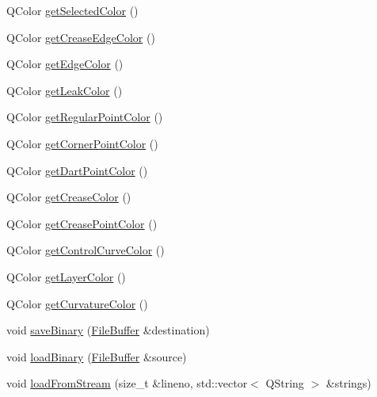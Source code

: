 \begin{DoxyCompactItemize}
Q\-Color \hyperlink{classShipCAD_1_1SubdivisionSurface_a4d307277e2a96d86b3d3e7788c2aac0a}{get\-Selected\-Color} ()
\item 
Q\-Color \hyperlink{classShipCAD_1_1SubdivisionSurface_a50b5868db7d2c5d6cce75fa2b52be60f}{get\-Crease\-Edge\-Color} ()
\item 
Q\-Color \hyperlink{classShipCAD_1_1SubdivisionSurface_a40dd77bdff5cf86b4a6eca7ff5a2e643}{get\-Edge\-Color} ()
\item 
Q\-Color \hyperlink{classShipCAD_1_1SubdivisionSurface_ac3131c3badeb6b11cb8a5ec5ceef0961}{get\-Leak\-Color} ()
\item 
Q\-Color \hyperlink{classShipCAD_1_1SubdivisionSurface_afdf406376421eb43a34f53392fbcf5b1}{get\-Regular\-Point\-Color} ()
\item 
Q\-Color \hyperlink{classShipCAD_1_1SubdivisionSurface_af64e951c070d6c88f70c399bc13809d1}{get\-Corner\-Point\-Color} ()
\item 
Q\-Color \hyperlink{classShipCAD_1_1SubdivisionSurface_ac355dfe572889755c24d1c8cd3145aea}{get\-Dart\-Point\-Color} ()
\item 
Q\-Color \hyperlink{classShipCAD_1_1SubdivisionSurface_a6aad1f3725f8033bb85403a01c252006}{get\-Crease\-Color} ()
\item 
Q\-Color \hyperlink{classShipCAD_1_1SubdivisionSurface_a82c8cb1c6c448be7554bcb42e0099660}{get\-Crease\-Point\-Color} ()
\item 
Q\-Color \hyperlink{classShipCAD_1_1SubdivisionSurface_a5b35353f739d224d8aa40ff19333ba98}{get\-Control\-Curve\-Color} ()
\item 
Q\-Color \hyperlink{classShipCAD_1_1SubdivisionSurface_a2a5e9c50d43e72829e02a8c0be31c260}{get\-Layer\-Color} ()
\item 
Q\-Color \hyperlink{classShipCAD_1_1SubdivisionSurface_aa39747141685b52d3987cf6c9f4e2aa8}{get\-Curvature\-Color} ()
\item 
void \hyperlink{classShipCAD_1_1SubdivisionSurface_a6e6254ecc6fcbdadf1ff4f646caa1d59}{save\-Binary} (\hyperlink{classShipCAD_1_1FileBuffer}{File\-Buffer} \&destination)
\item 
void \hyperlink{classShipCAD_1_1SubdivisionSurface_ac8ad644e0c19ac180fd4a7368fa410a6}{load\-Binary} (\hyperlink{classShipCAD_1_1FileBuffer}{File\-Buffer} \&source)
\item 
void \hyperlink{classShipCAD_1_1SubdivisionSurface_a489eed6508bb376170fa7926d2b7dc10}{load\-From\-Stream} (size\-\_\-t \&lineno, std\-::vector$<$ Q\-String $>$ \&strings)
\item 

\end{DoxyCompactItemize}

